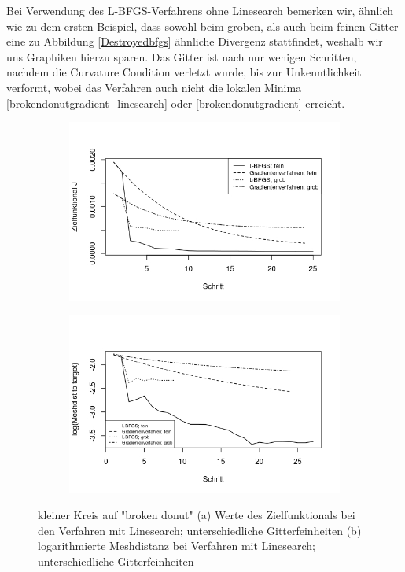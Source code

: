 Bei Verwendung des L-BFGS-Verfahrens ohne Linesearch bemerken wir, ähnlich wie zu dem ersten Beispiel, dass sowohl beim groben, als auch beim feinen Gitter eine zu Abbildung \ref{Destroyedbfgs} ähnliche Divergenz stattfindet, weshalb wir uns Graphiken hierzu sparen. Das Gitter ist nach nur wenigen Schritten, nachdem die Curvature Condition verletzt wurde, bis zur Unkenntlichkeit verformt, wobei das Verfahren auch nicht die lokalen Minima \ref{brokendonutgradient_linesearch} oder \ref{brokendonutgradient} erreicht. 

\begin{figure}
	\begin{subfigure}{0.5\textwidth}
	\centering
	\includegraphics[scale=0.48]{plot_donut_target.jpeg}
	\caption{}	
	\end{subfigure}
	\begin{subfigure}{0.5\textwidth}
	\centering
	\includegraphics[scale=0.48]{plot_donut_meshdist.jpeg}
	\caption{}	
	\end{subfigure}
\caption{kleiner Kreis auf "broken donut" (a) Werte des Zielfunktionals bei den Verfahren mit Linesearch; unterschiedliche Gitterfeinheiten (b) logarithmierte Meshdistanz bei Verfahren mit Linesearch; unterschiedliche Gitterfeinheiten}
\label{plot_konvergenzdonut}
\end{figure}

